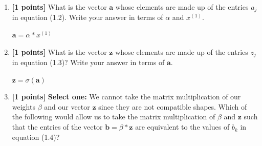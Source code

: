 \documentclass[11pt]{article}
\numberwithin{equation}{section} %
\numberwithin{figure}{section} %
\numberwithin{table}{section} %
\newcommand{\blackcircle}{\tikz\draw[black,fill=black] (0,0) circle (1ex);}
\renewcommand{\circle}{\tikz\draw[black] (0,0) circle (1ex);}
\newcommand{\av}{\mathbf{a}}
\newcommand{\bv}{\mathbf{b}}
\newcommand{\zv}{\mathbf{z}}
\newcommand{\points}[1]{{\bf [#1 points]}}
\begin{document}
\begin{enumerate}
\begin{enumerate}
        
        
        
        \item \points{1} What is the vector $\av$ whose elements are made up of the entries $a_j$ in equation (1.2). Write your answer in terms of $\alpha$ and $x^{(1)}$.
        
        \begin{tcolorbox}[fit,height=1cm, width=4cm, blank, borderline={1pt}{-2pt}]
            \begin{center}\huge$\av = \alpha*x^{(1)}$\end{center}
        \end{tcolorbox}
        
        
        
        
        \item \points{1} What is the vector $\zv$ whose elements are made up of the entries $z_j$ in equation (1.3)? Write your answer in terms of $\av$.
        
        \begin{tcolorbox}[fit,height=1cm, width=4cm, blank, borderline={1pt}{-2pt}]
            \begin{center}\huge$\zv = \sigma(\av)$\end{center}
        \end{tcolorbox}
        
        
        \item \points{1} \textbf{Select one:} We cannot take the matrix multiplication of our weights $\beta$ and our vector $\zv$ since they are not compatible shapes. Which of the following would allow us to take the matrix multiplication of $\beta$ and $\zv$ such that the entries of the vector $\bv = \beta*\zv$ are equivalent to the values of $b_k$ in equation (1.4)? 
        
        

\end{enumerate}
\end{enumerate}
\end{document}
